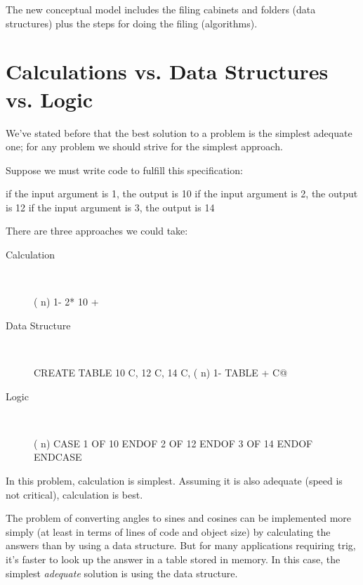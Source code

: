 The new conceptual model includes the filing cabinets and folders
(data structures) plus the steps for doing the filing (algorithms).
%

\section{Calculations vs. Data Structures vs. Logic}%
%
%
%
%
%

We've stated before that the best solution to a problem is the simplest
adequate one; for any problem we should strive for the simplest
approach.

Suppose we must write code to fulfill this specification:

\begin{Code}[fontfamily=cmss]
if the input argument is 1, the output is 10
if the input argument is 2, the output is 12
if the input argument is 3, the output is 14
\end{Code}
There are three approaches we could take:

\begin{description}
\item[Calculation]~

\begin{Code}
( n)  1-  2*  10 +
\end{Code}

\item[Data Structure]~

\begin{Code}
CREATE TABLE  10 C,  12 C,  14 C,
( n)  1- TABLE + C@
\end{Code}

\item[Logic]~

\begin{Code}
( n)  CASE
         1 OF 10 ENDOF
         2 OF 12 ENDOF
         3 OF 14 ENDOF  ENDCASE
\end{Code}
\end{description}
In this problem, calculation is simplest. Assuming it is also adequate
(speed is not critical), calculation is best.

The problem of converting angles to sines and cosines can be implemented
more simply (at least in terms of lines of code and object size)
by calculating the answers than by using a data structure. But for many
applications requiring trig, it's faster to look up the answer in a table
stored in memory. In this case, the simplest \emph{adequate} solution is using
the data structure.

